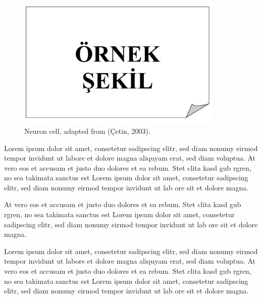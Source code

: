 \begin{figure}
	\centering
	\includegraphics[width=280pt,keepaspectratio=true]{./fig/sekil3}
	\caption{Neuron cell, adapted from (\c{C}etin, 2003).}
	\label{Figure3.1}
\end{figure}

Lorem ipsum dolor sit amet, consetetur sadipscing elitr, sed diam nonumy eirmod tempor invidunt ut labore et dolore magna aliquyam erat, sed diam voluptua. At vero eos et accusam et justo duo dolores et ea rebum. Stet clita kasd gub rgren, no sea takimata sanctus est Lorem ipsum dolor sit amet, consetetur sadipscing elitr, sed diam nonumy eirmod tempor invidunt ut lab ore sit et dolore magna.

At vero eos et accusam et justo duo dolores et ea rebum. Stet clita kasd gub rgren, no sea takimata sanctus est Lorem ipsum dolor sit amet, consetetur sadipscing elitr, sed diam nonumy eirmod tempor invidunt ut lab ore sit et dolore magna.

Lorem ipsum dolor sit amet, consetetur sadipscing elitr, sed diam nonumy eirmod tempor invidunt ut labore et dolore magna aliquyam erat, sed diam voluptua. At vero eos et accusam et justo duo dolores et ea rebum. Stet clita kasd gub rgren, no sea takimata sanctus est Lorem ipsum dolor sit amet, consetetur sadipscing elitr, sed diam nonumy eirmod tempor invidunt ut lab ore sit et dolore magna.


